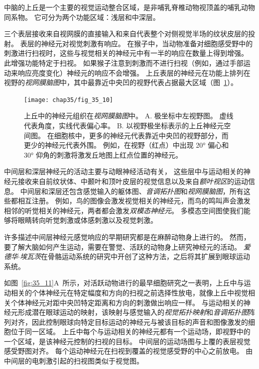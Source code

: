 中脑的上丘是一个主要的视觉运动整合区域，是非哺乳脊椎动物视顶盖的哺乳动物同系物。
它可分为两个功能区域：浅层和中深层。


三个表层接收来自视网膜的直接输入和来自代表整个对侧视觉半场的纹状皮层的投射。
表层的神经元对视觉刺激有响应。
在猴子中，当动物准备对细胞感受野中的刺激进行扫视时，这些与视觉相关的神经元中有一半的响应在数量上得到增强。
此增强功能特定于扫视。
如果猴子注意到刺激而不进行扫视（例如，通过手部运动来响应亮度变化）神经元的响应不会增强。
上丘表层的神经元在功能上排列在视野的\textit{视网膜脑图}中，其中最靠近中央凹的视野代表占据最大区域（图~\ref{fig:35_10}）。


\begin{figure}[htbp]
	\centering
	\texttt{[image: chap35/fig\_35\_10]}
	\caption{上丘中的神经元组织在\textit{视网膜脑图}中。
		A. 极坐标中左视野图。
		虚线代表角度，实线代表偏心率。
		B. 以视野极坐标表示的上丘神经元空间图。
		在细胞核中，更多的神经元代表靠近中央凹的视野部分，而更少的神经元代表外围。
		例如，在视野（红点）中出现 20° 偏心和 30° 仰角的刺激将激发丘地图上红点位置的神经元\cite{aizawa1998reversible}。}
	\label{fig:35_10}
\end{figure}


中间层和深层神经元的活动主要与动眼神经活动有关，
这些层中与运动相关的神经元接收来自前纹状体、中颞叶和顶叶皮层的视觉信息以及来自\textit{额叶视区}的运动信息。
中间层和深层还包含感觉输入的躯体图、\textit{音调拓扑图}和\textit{视网膜脑图}，所有这些都相互注册。
例如，鸟的图像会激发视觉相关的神经元，而鸟的鸣叫声会激发相邻的听觉相关的神经元，两者都会激发\textit{双模态神经元}。
多模态空间图使我们能够将眼睛转向听觉刺激或体感刺激以及视觉刺激。


许多描述中间层神经元感觉响应的早期研究都是在麻醉动物身上进行的。
然而，要了解大脑如何产生运动，需要在警觉、活跃的动物身上研究神经元的活动。
\textit{爱德华$\cdot$埃瓦茨}在骨骼运动系统的研究中开创了这种方法，之后将其扩展到眼球运动系统。


如图~\ref{fig:35_11}A~所示，对活跃动物进行的最早细胞研究之一表明，上丘中与运动相关的个体神经元在特定幅度和方向的扫视之前选择性放电，就像上丘中视觉相关个体神经元对距中央凹特定距离和方向的刺激做出响应一样。
与运动相关的神经元形成潜在眼球运动的映射，该映射与感觉输入的\textit{视觉拓扑映射}和\textit{音调拓扑图}阵列对齐，因此控制眼球向特定目标运动的神经元与被该目标的声音和图像激发的细胞位于同一区域。
上丘中每个与运动相关的神经元都有一个运动场，即视野中的一个区域，是该神经元控制的扫视的目标。
中间层的运动场图与上覆的表层视觉感受野图对齐。
每个运动神经元在扫视到覆盖的视觉感受野的中心之前放电。
由中间层的电刺激引起的扫视图类似于视觉图。



